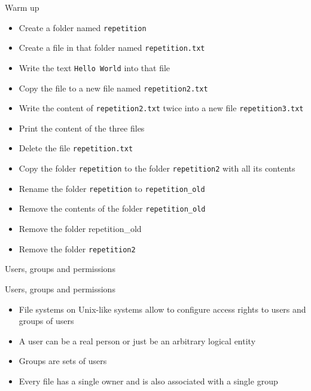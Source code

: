 \documentclass[aspectratio=1610]{beamer}
\newcommand\curtitle{}
\begin{document}
\begin{frame}[c]{Warm up}
    \begin{itemize}
        \item [\leftpointright] Create a folder named \texttt{repetition}
        \item [\leftpointright] Create a file in that folder named \texttt{repetition.txt}
        \item [\leftpointright] Write the text \texttt{Hello World} into that file
        \item [\leftpointright] Copy the file to a new file named \texttt{repetition2.txt}
        \item [\leftpointright] Write the content of \texttt{repetition2.txt} twice into a new file \texttt{repetition3.txt}
        \item [\leftpointright] Print the content of the three files
        \item [\leftpointright] Delete the file \texttt{repetition.txt}
        \item [\leftpointright] Copy the folder \texttt{repetition} to the folder \texttt{repetition2} with all its contents
        \item [\leftpointright] Rename the folder \texttt{repetition} to \texttt{repetition\_old}
        \item [\leftpointright] Remove the contents of the folder \texttt{repetition\_old}
        \item [\leftpointright] Remove the folder repetition\_old
        \item [\leftpointright] Remove the folder \texttt{repetition2}
    \end{itemize}
\end{frame}

\begin{frame}[c]
    \Huge Users, groups and permissions
\end{frame}


\renewcommand\curtitle{Users, groups and permissions}

\begin{frame}[c]{\curtitle}
    \begin{itemize}[<+->]
        \setlength\itemsep{1em}
        \item File systems on Unix-like systems allow to configure access rights to users and groups
            of users
        \item A user can be a real person or just be an arbitrary logical entity
        \item Groups are sets of users
        \item Every file has a single \alert{owner} and is also associated with a single
            \alert{group}
    \end{itemize}
\end{frame}
\end{document}
